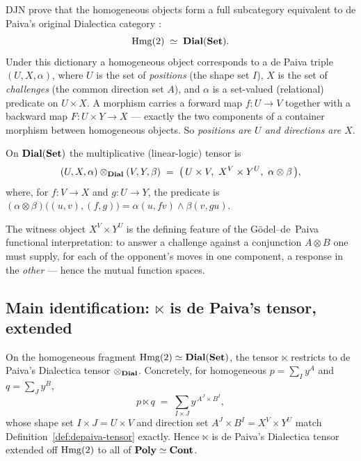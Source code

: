 DJN prove that the homogeneous objects form a full subcategory equivalent to de
Paiva's original Dialectica category
\cite[Prop.~2.13]{djn2305}:
\[
  \mathrm{Hmg}(2)\;\simeq\;\mathbf{Dial}(\mathbf{Set}).
\]
Under this dictionary a homogeneous object corresponds to a de Paiva triple
$(U,X,\alpha)$, where $U$ is the set of \emph{positions} (the shape set $I$),
$X$ is the set of \emph{challenges} (the common direction set $A$), and $\alpha$
is a set-valued (relational) predicate on $U\times X$. A morphism carries a
forward map $f\colon U\to V$ together with a backward map $F\colon U\times Y\to
X$ --- exactly the two components of a container morphism between homogeneous
objects. So \emph{positions are $U$ and directions are $X$}.

\begin{Definition}
\label{def:depaiva-tensor}
On $\mathbf{Dial}(\mathbf{Set})$ the multiplicative (linear-logic) tensor is
\[
  (U,X,\alpha)\dtens(V,Y,\beta)
    \;=\;\bigl(\,U\times V,\ X^{V}\times Y^{U},\ \alpha\otimes\beta\,\bigr),
\]
where, for $f\colon V\to X$ and $g\colon U\to Y$, the predicate is
$(\alpha\otimes\beta)\bigl((u,v),(f,g)\bigr)=\alpha(u,f v)\wedge\beta(v,g u)$.
\end{Definition}

The witness object $X^{V}\times Y^{U}$ is the defining feature of the
Gödel--de~Paiva functional interpretation: to answer a challenge against a
conjunction $A\otimes B$ one must supply, for each of the opponent's moves in
one component, a response in the \emph{other} --- hence the mutual function
spaces.

\subsection{Main identification: $\ltimes$ is de Paiva's tensor, extended}
\label{sec:dia-main}

\begin{Proposition}
\label{prop:ltimes-is-dial}
On the homogeneous fragment $\mathrm{Hmg}(2)\simeq\mathbf{Dial}(\mathbf{Set})$, the tensor $\ltimes$
restricts to de Paiva's Dialectica tensor $\mathbin{\otimes_{\mathbf{Dial}}}$. Concretely, for homogeneous
$p=\sum_{I}y^{A}$ and $q=\sum_{J}y^{B}$,
\[
  p\ltimes q \;=\;\sum_{I\times J} y^{\,A^{J}\times B^{I}},
\]
whose shape set $I\times J=U\times V$ and direction set
$A^{J}\times B^{I}=X^{V}\times Y^{U}$ match Definition~\ref{def:depaiva-tensor}
exactly. Hence $\ltimes$ is de Paiva's Dialectica tensor extended off
$\mathrm{Hmg}(2)$ to all of $\mathbf{Poly}\simeq\mathbf{Cont}$.
\end{Proposition}

